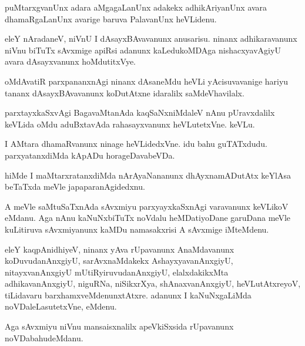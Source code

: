 \documentclass{article}
\begin{document}
\begin{mn}%
puMtarxgvanUnx adara aMgagaLanUnx adakekx adhikAriyanUnx avara dhamaRgaLanUnx avarige 
baruva PalavanUnx heVLidenu.
\end{mn}

\begin{mn}%
eleY nAradaneV, niVnU I dAsayxBAvavanunx anusarisu. ninanx adhikaravanunx niVnu biTuTx 
sAvxmige apiRsi adanunx kaLedukoMDAga nishacxyavAgiyU avara dAsayxvanunx hoMdutitxVye.
\end{mn}

\begin{mn}%
oMdAvatiR parxpananxnAgi ninanx dAsaneMdu heVLi yAcisuvavanige hariyu tananx 
dAsayxBAvavanunx koDutAtxne idaralilx saMdeVhavilalx. 
\end{mn}

\begin{mn}%
parxtayxkaSxvAgi BagavaMtanAda kaqSaNxniMdaleV nAnu pUravxdalilx keVLida oMdu aduBxtavAda 
rahasayxvanunx heVLutetxVne. keVLu.
\end{mn}

\begin{mn}%
I AMtara dhamaRvanunx ninage heVLidedxVne. idu bahu guTATxdudu. parxyatanxdiMda kApADu 
horageDavabeVDa.
\end{mn}

\begin{mn}%
hiMde I maMtarxratanxdiMda nArAyaNananunx dhAyxnamADutAtx keYlAsa beTaTxda meVle 
japaparanAgidedxnu.
\end{mn}

\begin{mn}%
A meVle saMtuSaTxnAda sAvxmiyu parxyayxkaSxnAgi varavanunx keVLikoV eMdanu. Aga nAnu 
kaNuNxbiTuTx noVdalu heMDatiyoDane garuDana meVle kuLitiruva sAvxmiyanunx kaMDu 
namasakxrisi A sAvxmige iMteMdenu.
\end{mn}

\begin{mn}%
eleY kaqpAnidhiyeV, ninanx yAva rUpavanunx AnaMdavanunx koDuvudanAnxgiyU, sarAvxnaMdakekx
AshayxyavanAnxgiyU, nitayxvanAnxgiyU mUtiRyiruvudanAnxgiyU, elalxdakikxMta 
adhikavanAnxgiyU, niguRNa, niSikxrXya, shAnaxvanAnxgiyU, heVLutAtxreyoV, tiLidavaru 
barxhamxveMdenunxtAtxre. adanunx I kaNuNxgaLiMda noVDaleLasutetxVne, eMdenu.
\end{mn}

\begin{mn}%
Aga sAvxmiyu niVnu mansaisxnalilx apeVkiSxsida rUpavanunx noVDabahudeMdanu.
\end{mn}
\end{document}

